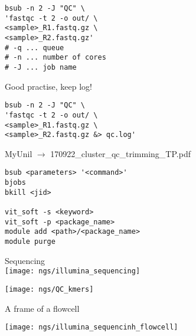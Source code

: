 \documentclass[xcolor=dvipsnames]{beamer}
\begin{document}
\begin{frame}[fragile]
\LARGE
\begin{verbatim}
bsub -n 2 -J "QC" \
'fastqc -t 2 -o out/ \
<sample>_R1.fastq.gz \
<sample>_R2.fastq.gz'
# -q ... queue
# -n ... number of cores
# -J ... job name
\end{verbatim}
\end{frame}

\begin{frame}[fragile]
Good practise, keep log!
\LARGE
\begin{verbatim}
bsub -n 2 -J "QC" \
'fastqc -t 2 -o out/ \
<sample>_R1.fastq.gz \
<sample>_R2.fastq.gz &> qc.log'
\end{verbatim}
\end{frame}

\begin{frame}[fragile]
	\begin{center}
		\Large
		MyUnil $\rightarrow$ 170922\_cluster\_qc\_trimming\_TP.pdf
	\end{center}
\huge
\begin{verbatim}
bsub <parameters> '<command>'
bjobs
bkill <jid>

vit_soft -s <keyword>
vit_soft -p <package_name>
module add <path>/<package_name>
module purge
\end{verbatim}
\end{frame}

\begin{frame}
	\begin{center}
		\Huge
		Sequencing\\
		\vspace{1cm}
		\texttt{[image: ngs/illumina\_sequencing]}
	\end{center}
\end{frame}

\begin{frame}
	\texttt{[image: ngs/QC\_kmers]}
\end{frame}

\begin{frame}
	\Huge
	A frame of a flowcell \\
	\begin{center}
		\texttt{[image: ngs/illumina\_sequencinh\_flowcell]}
	\end{center}
\end{frame}
\end{document}
